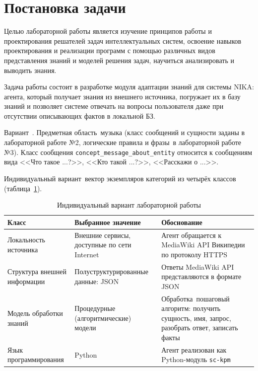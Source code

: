 \section{Постановка задачи}
\label{sec:task}

Целью лабораторной работы является изучение принципов работы и проектирования решателей задач интеллектуальных систем, освоение навыков проектирования и реализации программ с помощью различных видов представления знаний и моделей решения задач, научиться анализировать и выводить знания.

Задача работы состоит в разработке модуля адаптации знаний для системы NIKA: агента, который получает знания из внешнего источника, погружает их в базу знаний и позволяет системе отвечать на вопросы пользователя даже при отсутствии описывающих фактов в локальной БЗ.

Вариант~. Предметная область~\mdash  музыка (класс сообщений и сущности заданы в лабораторной работе №2, логические правила и фразы~\mdash  в лабораторной работе №3). Класс сообщения \texttt{concept\_message\_about\_entity} относится к сообщениям вида <<Что такое ...?>>, <<Кто такой ...?>>, <<Расскажи о ...>>.

Индивидуальный вариант~\mdash  вектор экземпляров категорий из четырёх классов (таблица~\ref{tab:variant}).

\begin{table}[H]
	\centering
	\small
	\begin{tabular}{|p{4.6cm}|p{4.6cm}|p{5.2cm}|}
		\hline
		Класс & Выбранное значение & Обоснование \\
		\hline
		Локальность источника & Внешние сервисы, доступные по сети Internet & Агент обращается к MediaWiki API Википедии по протоколу HTTPS \\
		\hline
		Структура внешней информации & Полуструктурированные данные: JSON & Ответы MediaWiki API представляются в формате JSON \\
		\hline
		Модель обработки знаний & Процедурные (алгоритмические) модели & Обработка~\mdash  пошаговый алгоритм: получить сущность, имя, запрос, разобрать ответ, записать факты \\
		\hline
		Язык программирования & Python & Агент реализован как Python-модуль \texttt{sc-kpm} \\
		\hline
	\end{tabular}
	\caption{Индивидуальный вариант лабораторной работы}
	\label{tab:variant}
\end{table}

